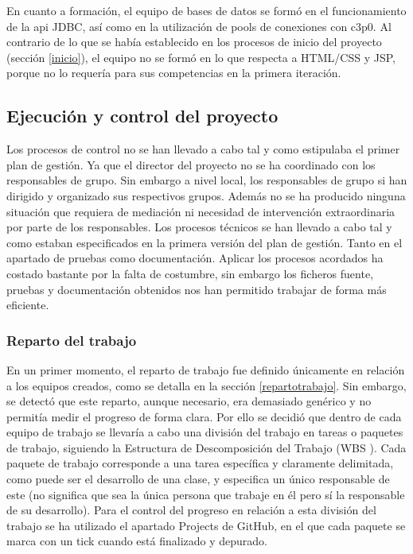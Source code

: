En cuanto a formación, el equipo de bases de datos se formó en el funcionamiento de la api JDBC, así como en la utilización de pools de conexiones con c3p0. Al contrario de lo que se había establecido en los procesos de inicio del proyecto (sección \ref{inicio}), el equipo no se formó en lo que respecta a HTML/CSS y JSP, porque no lo requería para sus competencias en la primera iteración.
\subsection{Ejecución y control del proyecto}
\label{Ejecucion y control del proyecto}
Los procesos de control no se han llevado a cabo tal y como estipulaba el primer plan de gestión. Ya que el director del proyecto no se ha coordinado con los responsables de grupo. Sin embargo a nivel local, los responsables de grupo si han dirigido y organizado sus respectivos grupos. Además no se ha producido ninguna situación que requiera de mediación ni necesidad de intervención extraordinaria por parte de los responsables. 
Los procesos técnicos se han llevado a cabo tal y como estaban especificados en la primera versión del plan de gestión. Tanto en el apartado de pruebas como documentación. Aplicar los procesos acordados ha costado bastante por la falta de costumbre, sin embargo los ficheros fuente, pruebas y documentación obtenidos nos han permitido trabajar de forma más eficiente.
\subsubsection{Reparto del trabajo}
En un primer momento, el reparto de trabajo fue definido únicamente en relación a los equipos creados, como se detalla en la sección \ref{repartotrabajo}. Sin embargo, se detectó que este reparto, aunque necesario, era demasiado genérico y no permitía medir el progreso de forma clara. Por ello se decidió que dentro de cada equipo de trabajo se llevaría a cabo una división del trabajo en tareas o paquetes de trabajo, siguiendo la Estructura de Descomposición del Trabajo (WBS \cite{edt}). Cada paquete de trabajo corresponde a una tarea específica y claramente delimitada, como puede ser el desarrollo de una clase, y especifica un único responsable de este (no significa que sea la única persona que trabaje en él pero sí la responsable de su desarrollo). Para el control del progreso en relación a esta división del trabajo se ha utilizado el apartado Projects de GitHub, en el que cada paquete se marca con un tick cuando está finalizado y depurado.

